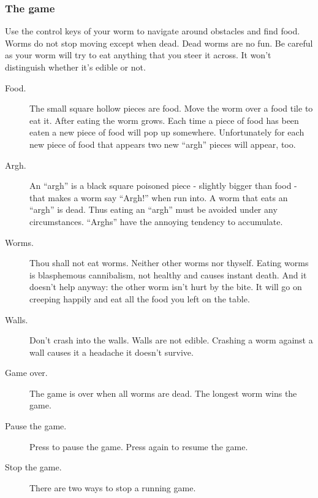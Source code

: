 \subsubsection{The game}
Use the control keys of your worm to navigate around obstacles and find
food. Worms do not stop moving except when dead. Dead worms are no fun.
Be careful as your worm will try to eat anything that you steer it
across. It won't distinguish whether it's edible or not.

\begin{description}
\item[Food.]
The small square hollow pieces are food. Move the worm over a food tile
to eat it. After eating the worm grows. Each time a piece of food has
been eaten a new piece of food will pop up somewhere. Unfortunately for
each new piece of food that appears two new ``argh'' pieces will
appear, too.
\item[Argh.]
An ``argh'' is a black square poisoned piece {}- slightly bigger than
food {}- that makes a worm say ``Argh!'' when
run into.  A worm that eats an ``argh'' is dead. Thus eating an
``argh'' must be avoided under any circumstances. ``Arghs'' have the
annoying tendency to accumulate. 
\item[Worms.]
Thou shall not eat worms. Neither other worms nor thyself. Eating worms
is blasphemous cannibalism, not healthy and causes instant
death. And it doesn't help anyway: the other worm
isn't hurt by the bite. It will go on creeping happily
and eat all the food you left on the table. 
\item[Walls.]
Don't crash into the walls. Walls are not edible.
Crashing a worm against a wall causes it a headache it
doesn't survive. 
\item[Game over.]
The game is over when all worms are dead. The longest worm wins the
game. 
\item [Pause the game.]
Press
to pause the game. Press
again to resume the game.

\item[Stop the game.]
There are two ways to stop a running game.


\end{description}
